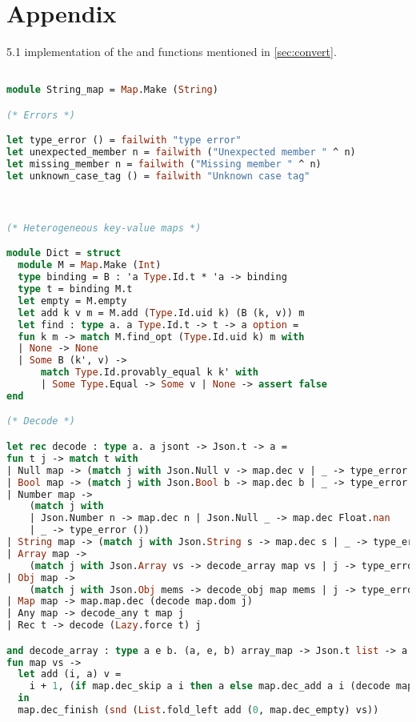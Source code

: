 \documentclass[nolinenum]{jfp}
\begin{document}
\section*{Appendix}
\label{sec:appendix}

\ocaml{} 5.1 implementation of the  and 
functions mentioned in \autoref{sec:convert}.

\begin{lstlisting}[language=ocaml]

module String_map = Map.Make (String)

(* Errors *)

let type_error () = failwith "type error"
let unexpected_member n = failwith ("Unexpected member " ^ n)
let missing_member n = failwith ("Missing member " ^ n)
let unknown_case_tag () = failwith "Unknown case tag"



(* Heterogeneous key-value maps *)

module Dict = struct
  module M = Map.Make (Int)
  type binding = B : 'a Type.Id.t * 'a -> binding
  type t = binding M.t
  let empty = M.empty
  let add k v m = M.add (Type.Id.uid k) (B (k, v)) m
  let find : type a. a Type.Id.t -> t -> a option =
  fun k m -> match M.find_opt (Type.Id.uid k) m with
  | None -> None
  | Some B (k', v) ->
      match Type.Id.provably_equal k k' with
      | Some Type.Equal -> Some v | None -> assert false
end

(* Decode *)

let rec decode : type a. a jsont -> Json.t -> a =
fun t j -> match t with
| Null map -> (match j with Json.Null v -> map.dec v | _ -> type_error ())
| Bool map -> (match j with Json.Bool b -> map.dec b | _ -> type_error ())
| Number map ->
    (match j with
    | Json.Number n -> map.dec n | Json.Null _ -> map.dec Float.nan
    | _ -> type_error ())
| String map -> (match j with Json.String s -> map.dec s | _ -> type_error ())
| Array map ->
    (match j with Json.Array vs -> decode_array map vs | j -> type_error ())
| Obj map ->
    (match j with Json.Obj mems -> decode_obj map mems | j -> type_error ())
| Map map -> map.map.dec (decode map.dom j)
| Any map -> decode_any t map j
| Rec t -> decode (Lazy.force t) j

and decode_array : type a e b. (a, e, b) array_map -> Json.t list -> a =
fun map vs ->
  let add (i, a) v =
    i + 1, (if map.dec_skip a i then a else map.dec_add a i (decode map.elt v))
  in
  map.dec_finish (snd (List.fold_left add (0, map.dec_empty) vs))


\end{lstlisting}
\end{document}
